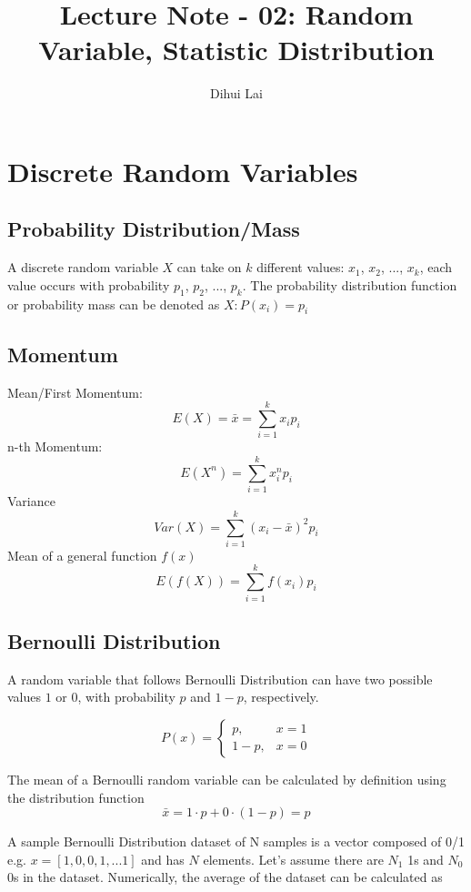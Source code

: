 \documentclass[12pt, oneside]{article}
\title{Lecture Note - 02: Random Variable, Statistic Distribution}
\author{Dihui Lai}
\begin{document}
\maketitle
\tableofcontents

\vspace{.25in}

\section{Discrete Random Variables}

\subsection{Probability Distribution/Mass}

A discrete random variable $X$ can take on $k$ different values: $x_1$, $x_2$, ..., $x_k$, each value occurs with probability $p_1$, $p_2$, ..., $p_k$. The probability distribution function or probability mass can be denoted as $X: P(x_i)=p_i$

\subsection{Momentum}

Mean/First Momentum:
$$E(X)=\bar{x}=\sum\limits_{i=1}^k x_i p_i$$
n-th Momentum:
$$E(X^n)=\sum\limits_{i=1}^k x_i^n p_i$$
Variance
$$Var(X)=\sum\limits_{i=1}^k (x_i-\bar{x})^2 p_i$$
Mean of a general function $f(x)$
$$E(f(X))=\sum\limits_{i=1}^k f(x_i) p_i$$

\subsection{Bernoulli Distribution}
A random variable that follows Bernoulli Distribution can have two possible values $1$ or $0$, with probability $p$ and $1-p$, respectively.

\begin{equation}
P(x)=
\begin{cases}
p, &x=1\\
1-p, &x=0
\end{cases}
\end{equation}

The mean of a Bernoulli random variable can be calculated by definition using the distribution function 
$$\bar{x}=1\cdot p+0\cdot(1-p)=p$$

A sample Bernoulli Distribution dataset of N samples is a vector composed of 0/1 e.g. $x=[1, 0, 0, 1, ...1]$ and has $N$ elements. Let's assume there are $N_1$ 1s and $N_0$ 0s in the dataset. Numerically, the average of the dataset can be calculated as 
\end{document}
